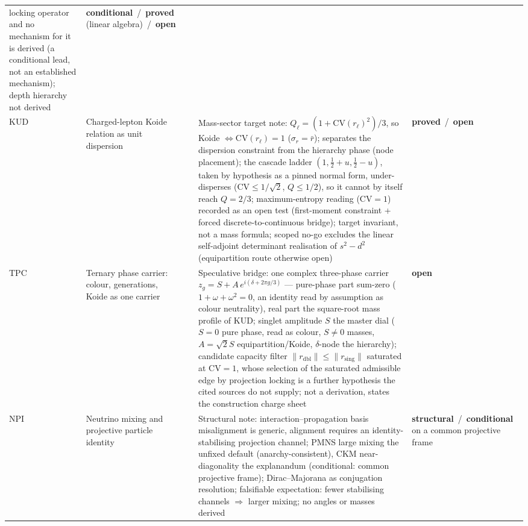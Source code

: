 \documentclass[11pt,a4paper]{article}
\newcommand{\sproved}{\textcolor{cproved}{\textbf{proved}}}
\newcommand{\sstruct}{\textcolor{cstruct}{\textbf{structural}}}
\newcommand{\sopen}{\textcolor{copen}{\textbf{open}}}
\newcommand{\scond}{\textcolor{ccond}{\textbf{conditional}}}
\begin{document}
\begin{longtable}{@{}p{1.70cm}p{2.9cm}p{1.3cm}p{6.25cm}>{\raggedright\arraybackslash}p{2.0cm}@{}}
      locking operator and no mechanism for it is derived (a conditional lead, not an established mechanism);
      depth hierarchy not derived &
      \scond\ /\ \sproved{} (linear algebra)\ /\ \sopen \\[3pt]
      KUD & Charged-lepton Koide relation as unit dispersion & \cite{Beau2026kud} &
      Mass-sector target note: $Q_\ell = (1+\mathrm{CV}(r_\ell)^2)/3$, so Koide $\iff \mathrm{CV}(r_\ell) = 1$
      ($\sigma_r = \bar r$); separates the dispersion constraint from the hierarchy phase (node placement);
      the cascade ladder $(1,\tfrac12+u,\tfrac12-u)$, taken by hypothesis as a pinned normal form, under-disperses
      ($\mathrm{CV}\le 1/\sqrt2$, $Q\le 1/2$), so it cannot by itself reach $Q=2/3$; maximum-entropy reading ($\mathrm{CV}=1$) recorded as an open test (first-moment
      constraint + forced discrete-to-continuous bridge); target invariant, not a mass formula; scoped no-go excludes
      the linear self-adjoint determinant realisation of $s^2-d^2$ (equipartition route otherwise open) &
      \sproved\ /\ \sopen \\[3pt]
      TPC & Ternary phase carrier: colour, generations, Koide as one carrier & \cite{Beau2026tpc} &
      Speculative bridge: one complex three-phase carrier $z_g = S + A\,e^{i(\delta+2\pi g/3)}$ --- pure-phase part
      sum-zero ($1+\omega+\omega^2=0$, an identity read by assumption as colour neutrality), real part the
      square-root mass profile of KUD; singlet amplitude $S$ the master dial ($S=0$ pure phase, read as colour,
      $S\neq0$ masses, $A=\sqrt2 S$ equipartition/Koide,
      $\delta$-node the hierarchy); candidate capacity filter $\lVert r_{\mathrm{dbl}}\rVert\le\lVert
      r_{\mathrm{sing}}\rVert$
      saturated at $\mathrm{CV}=1$, whose selection of the saturated admissible edge by projection locking is a further
      hypothesis the cited sources do not supply; not a derivation, states the construction charge sheet &
      \sopen \\[3pt]
      NPI & Neutrino mixing and projective particle identity & \cite{Beau2026npi} &
      Structural note: interaction--propagation basis misalignment is generic, alignment requires an
      identity-stabilising projection channel; PMNS large mixing the unfixed default (anarchy-consistent),
      CKM near-diagonality the explanandum (conditional: common projective frame); Dirac--Majorana as
      conjugation resolution; falsifiable expectation: fewer stabilising channels $\Rightarrow$ larger mixing;
      no angles or masses derived &
      \sstruct\ /\ \scond{} on a common projective frame \\[3pt]

\end{longtable}
\end{document}

